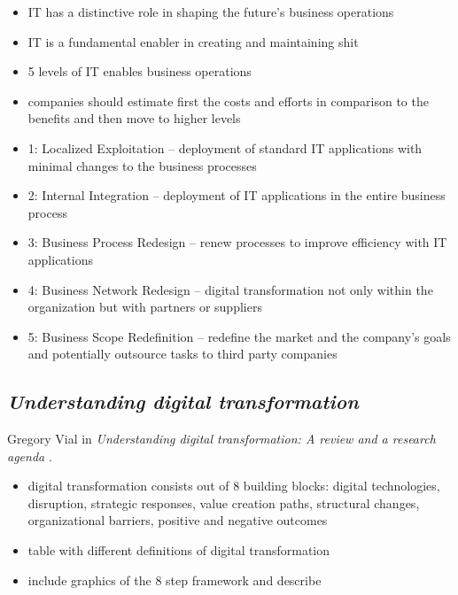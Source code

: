 \documentclass[a4]{scrartcl}
\begin{document}
	\begin{itemize}
		\item IT has a distinctive role in shaping the future's business operations
		\item IT is a fundamental enabler in creating and maintaining shit
		\item 5 levels of IT enables business operations
		\item companies should estimate first the costs and efforts in comparison to the benefits and then move to higher levels
		\item 1: Localized Exploitation -- deployment of standard IT applications with minimal changes to the business processes
		\item 2: Internal Integration -- deployment of IT applications in the entire business process
		\item 3: Business Process Redesign -- renew processes to improve efficiency with IT applications
		\item 4: Business Network Redesign -- digital transformation not only within the organization but with partners or suppliers
		\item 5: Business Scope Redefinition -- redefine the market and the company's goals and potentially outsource tasks to third party companies
	\end{itemize}
	
	
	
	
	
	
	
\subsection{\textit{Understanding digital transformation}} \label{vial}	
	
Gregory Vial in \textit{Understanding digital transformation: A review and a research agenda} \cite{vial}.

\begin{itemize}
	\item digital transformation consists out of 8 building blocks: digital technologies, disruption, strategic responses, value creation paths, structural changes, organizational barriers, positive and negative outcomes
	\item table with different definitions of digital transformation
	\item include graphics of the 8 step framework and describe
\end{itemize}
	
\end{document}
